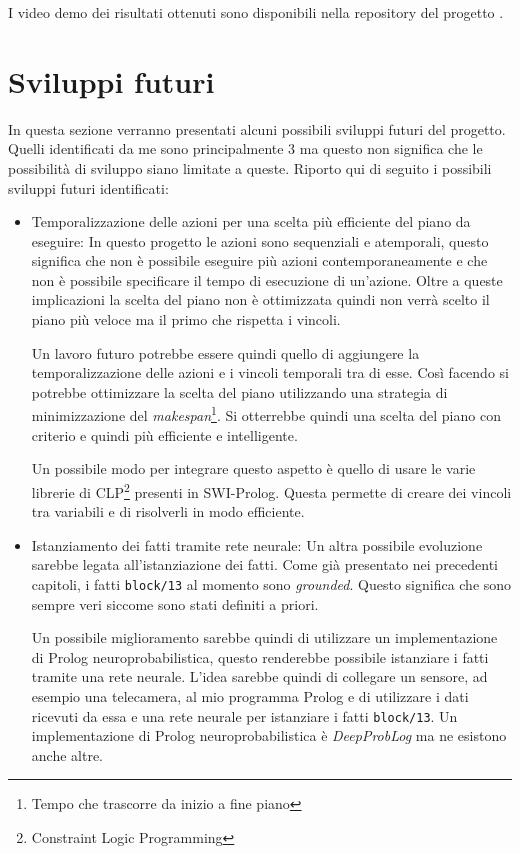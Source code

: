I video demo dei risultati ottenuti sono disponibili nella repository del progetto \cite{gitrepo}.
\section{Sviluppi futuri}
\label{sec:sviluppifuturi}
In questa sezione verranno presentati alcuni possibili sviluppi futuri del progetto. Quelli identificati da me sono principalmente 3 ma questo non significa che le possibilità di sviluppo siano limitate a queste. Riporto qui di seguito i possibili sviluppi futuri identificati:
\begin{itemize}
      \item Temporalizzazione delle azioni per una scelta più efficiente del piano da eseguire: In questo progetto le azioni sono sequenziali e atemporali, questo significa che non è possibile eseguire più azioni contemporaneamente e che non è possibile specificare il tempo di esecuzione di un'azione.
      Oltre a queste implicazioni la scelta del piano non è ottimizzata quindi non verrà scelto il piano più veloce ma il primo che rispetta i vincoli.
      
      Un lavoro futuro potrebbe essere quindi quello di aggiungere la temporalizzazione delle azioni e i vincoli temporali tra di esse. Così facendo si potrebbe ottimizzare la scelta del piano utilizzando una strategia di minimizzazione del \textit{makespan}\footnote{Tempo che trascorre da inizio a fine piano}.
      Si otterrebbe quindi una scelta del piano con criterio e quindi più efficiente e intelligente. 
      
      Un possibile modo per integrare questo aspetto è quello di usare le varie librerie di CLP\footnote{Constraint Logic Programming} presenti in SWI-Prolog. Questa permette di creare dei vincoli tra variabili e di risolverli in modo efficiente.
      
      \item Istanziamento dei fatti tramite rete neurale: Un altra possibile evoluzione sarebbe legata all'istanziazione dei fatti. Come già presentato nei precedenti capitoli, i fatti \verb+block/13+ al momento sono \textit{grounded}. 
      Questo significa che sono sempre veri siccome sono stati definiti a priori. 
      
      Un possibile miglioramento sarebbe quindi di utilizzare un implementazione di Prolog neuroprobabilistica, questo renderebbe possibile istanziare i fatti tramite una rete neurale.
      L'idea sarebbe quindi di collegare un sensore, ad esempio una telecamera, al mio programma Prolog e di utilizzare i dati ricevuti da essa e una rete neurale per istanziare i fatti \verb+block/13+.
      Un implementazione di Prolog neuroprobabilistica è \textit{DeepProbLog} \cite{MANHAEVE2021103504} ma ne esistono anche altre.
      

\end{itemize}
